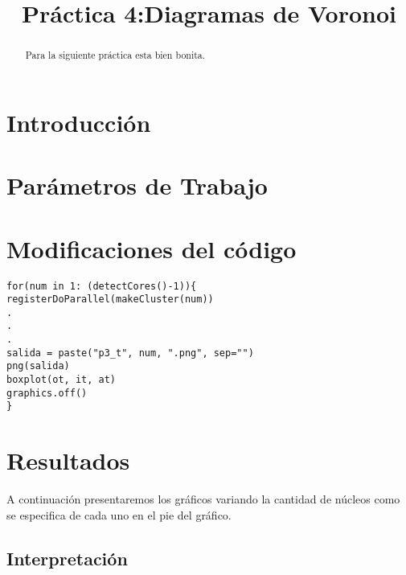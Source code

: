 \documentclass[a4paper]{article}
\title{Práctica 4:Diagramas de Voronoi}
\begin{document}
\maketitle

\begin{abstract}
	Para la siguiente práctica esta bien bonita. 

\end{abstract}

\section{Introducci\'on}

\section{Par\'ametros de Trabajo}



\section{Modificaciones del código}



\lstset{language=R, breaklines=true, basicstyle=\footnotesize}

\begin{lstlisting}[frame=single]
for(num in 1: (detectCores()-1)){
registerDoParallel(makeCluster(num))
.
.
.
salida = paste("p3_t", num, ".png", sep="")
png(salida)
boxplot(ot, it, at)
graphics.off()
}
\end{lstlisting}

\section{Resultados}
A continuación presentaremos los gráficos variando la cantidad de núcleos como se especifica de cada uno en el pie del gráfico.


\subsection{Interpretación}
\end{document}
